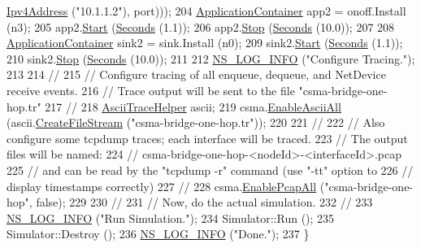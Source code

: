 \begin{DoxyCode}
      \hyperlink{classns3_1_1Ipv4Address}{Ipv4Address} (\textcolor{stringliteral}{"10.1.1.2"}), port)));
204   \hyperlink{classns3_1_1ApplicationContainer}{ApplicationContainer} app2 = onoff.Install (n3);
205   app2.\hyperlink{classns3_1_1ApplicationContainer_a8eff87926507020bbe3e1390358a54a7}{Start} (\hyperlink{group__timecivil_ga33c34b816f8ff6628e33d5c8e9713b9e}{Seconds} (1.1));
206   app2.\hyperlink{classns3_1_1ApplicationContainer_adfc52f9aa4020c8714679b00bbb9ddb3}{Stop} (\hyperlink{group__timecivil_ga33c34b816f8ff6628e33d5c8e9713b9e}{Seconds} (10.0));
207 
208   \hyperlink{classns3_1_1ApplicationContainer}{ApplicationContainer} sink2 = sink.Install (n0);
209   sink2.\hyperlink{classns3_1_1ApplicationContainer_a8eff87926507020bbe3e1390358a54a7}{Start} (\hyperlink{group__timecivil_ga33c34b816f8ff6628e33d5c8e9713b9e}{Seconds} (1.1));
210   sink2.\hyperlink{classns3_1_1ApplicationContainer_adfc52f9aa4020c8714679b00bbb9ddb3}{Stop} (\hyperlink{group__timecivil_ga33c34b816f8ff6628e33d5c8e9713b9e}{Seconds} (10.0));
211 
212   \hyperlink{group__logging_gafbd73ee2cf9f26b319f49086d8e860fb}{NS\_LOG\_INFO} (\textcolor{stringliteral}{"Configure Tracing."});
213 
214   \textcolor{comment}{//}
215   \textcolor{comment}{// Configure tracing of all enqueue, dequeue, and NetDevice receive events.}
216   \textcolor{comment}{// Trace output will be sent to the file "csma-bridge-one-hop.tr"}
217   \textcolor{comment}{//}
218   \hyperlink{classns3_1_1AsciiTraceHelper}{AsciiTraceHelper} ascii;
219   csma.\hyperlink{classns3_1_1AsciiTraceHelperForDevice_a63e57c878526c732924e14c1e52cca8b}{EnableAsciiAll} (ascii.\hyperlink{classns3_1_1AsciiTraceHelper_a44960bf2ca32835024eaedd26d1c4f94}{CreateFileStream} (\textcolor{stringliteral}{"csma-bridge-one-hop.tr"}));
220 
221   \textcolor{comment}{//}
222   \textcolor{comment}{// Also configure some tcpdump traces; each interface will be traced.}
223   \textcolor{comment}{// The output files will be named:}
224   \textcolor{comment}{//     csma-bridge-one-hop-<nodeId>-<interfaceId>.pcap}
225   \textcolor{comment}{// and can be read by the "tcpdump -r" command (use "-tt" option to}
226   \textcolor{comment}{// display timestamps correctly)}
227   \textcolor{comment}{//}
228   csma.\hyperlink{classns3_1_1PcapHelperForDevice_a4ab183a2512120200d4a0e5d8ececd49}{EnablePcapAll} (\textcolor{stringliteral}{"csma-bridge-one-hop"}, \textcolor{keyword}{false});
229 
230   \textcolor{comment}{//}
231   \textcolor{comment}{// Now, do the actual simulation.}
232   \textcolor{comment}{//}
233   \hyperlink{group__logging_gafbd73ee2cf9f26b319f49086d8e860fb}{NS\_LOG\_INFO} (\textcolor{stringliteral}{"Run Simulation."});
234   Simulator::Run ();
235   Simulator::Destroy ();
236   \hyperlink{group__logging_gafbd73ee2cf9f26b319f49086d8e860fb}{NS\_LOG\_INFO} (\textcolor{stringliteral}{"Done."});
237 \}
\end{DoxyCode}


